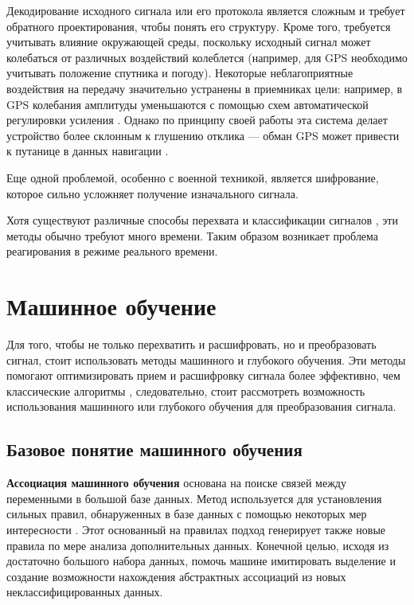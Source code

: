 Декодирование исходного сигнала или его протокола является сложным \cite{analisanddecod} и требует обратного проектирования, чтобы понять его структуру. Кроме того, требуется учитывать влияние окружающей среды, поскольку исходный сигнал может колебаться от различных воздействий колеблется (например, для GPS необходимо учитывать положение спутника и погоду). Некоторые неблагоприятные воздействия на передачу значительно устранены в приемниках цели: например, в GPS колебания амплитуды уменьшаются с помощью схем автоматической регулировки усиления \cite{autogaincontrol}. Однако по принципу своей работы эта система делает устройство более склонным к глушению отклика --- обман GPS может привести к путанице в данных навигации \cite{gpsspoofing}.

Еще одной проблемой, особенно с военной техникой, является шифрование, которое сильно усложняет получение изначального сигнала.

Хотя существуют различные способы перехвата и классификации сигналов \cite{analisanddecod}, эти методы обычно требуют много времени. Таким образом возникает проблема реагирования в режиме реального времени.

\section{Машинное обучение}

Для того, чтобы не только перехватить и расшифровать, но и преобразовать сигнал, стоит использовать методы машинного и глубокого обучения. Эти методы помогают оптимизировать прием и расшифровку сигнала более эффективно, чем классические алгоритмы \cite{deeplearnofdm}, следовательно, стоит рассмотреть возможность использования машинного или глубокого обучения для преобразования сигнала.

\subsection*{Базовое понятие машинного обучения}

\textbf{Ассоциация машинного обучения} основана на поиске связей между переменными в большой базе данных. Метод используется для установления сильных правил, обнаруженных в базе данных с помощью некоторых мер интересности \cite{introdmachlearn}. Этот основанный на правилах подход генерирует также новые правила по мере анализа дополнительных данных. Конечной целью, исходя из достаточно большого набора данных, помочь машине имитировать выделение и создание возможности нахождения абстрактных ассоциаций из новых неклассифицированных данных.

